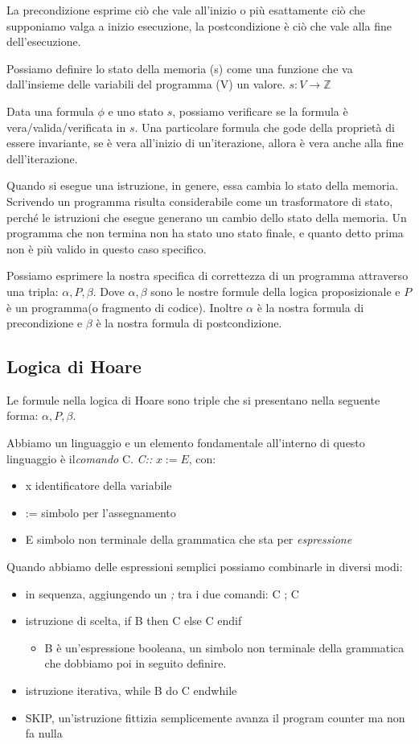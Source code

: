 La precondizione esprime ciò che vale all'inizio o più esattamente ciò che supponiamo valga a inizio esecuzione, la postcondizione è ciò che vale alla fine dell'esecuzione.
\newline 

Possiamo definire lo stato della memoria (s) come una funzione che va dall'insieme delle variabili del programma (V) un valore. $s : V \to \mathbb{Z}$

Data una formula $\phi$ e uno stato $s$, possiamo verificare se la formula è vera/valida/verificata in $s$. Una particolare formula che gode della proprietà di essere invariante, se è vera all’inizio di un’iterazione, allora è vera anche alla fine dell’iterazione.

Quando si esegue una istruzione, in genere, essa cambia lo stato della memoria. Scrivendo un programma risulta considerabile come un trasformatore di stato, perché le istruzioni che esegue generano un cambio dello stato della memoria. Un programma che non termina non ha stato uno stato finale, e quanto detto prima non è più valido in questo caso specifico.

Possiamo esprimere la nostra specifica di correttezza di un programma attraverso una tripla: $\alpha,P, \beta $. Dove $\alpha,\beta $ sono le nostre formule della logica proposizionale e $P$ è un programma(o fragmento di codice). Inoltre $\alpha$ è la nostra formula di precondizione e $\beta$ è la nostra formula di postcondizione.

\subsection{Logica di Hoare}
Le formule nella logica di Hoare sono triple che si presentano nella seguente forma: $\alpha,P, \beta$.

Abbiamo un linguaggio e un elemento fondamentale all'interno di questo linguaggio è il\textit{comando} C.
\textit{C::} $x := E$, con: 
\begin{itemize}
    \item x identificatore della variabile 
    \item := simbolo per l'assegnamento 
    \item E simbolo non terminale della grammatica che sta per \textit{espressione}
\end{itemize}
Quando abbiamo delle espressioni semplici possiamo combinarle in diversi modi:
\begin{itemize}
    \item in sequenza, aggiungendo un \textit{;} tra i due comandi: C ; C
    \item istruzione di scelta, if B then C else C endif
    \begin{itemize}
        \item B è un'espressione booleana, un simbolo non terminale della grammatica che dobbiamo poi in seguito definire.
    \end{itemize}
    \item istruzione iterativa, while B do C endwhile
    \item SKIP, un'istruzione fittizia semplicemente avanza il program counter ma non fa nulla
\end{itemize}

